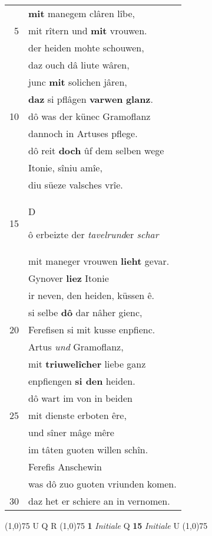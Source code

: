 \documentclass[8pt,a4paper,notitlepage]{article}
\begin{document}
\begin{table}[ht]
\begin{minipage}[t]{0.5\linewidth}
\begin{tabular}{rl}
 & \textbf{mit} manegem clâren lîbe,\\ 
5 & mit rîtern und \textbf{mit} vrouwen.\\ 
 & der heiden mohte schouwen,\\ 
 & daz ouch dâ liute wâren,\\ 
 & junc \textbf{mit} solichen jâren,\\ 
 & \textbf{daz} si pflâgen \textbf{varwen} \textbf{glanz}.\\ 
10 & dô was der künec Gramoflanz\\ 
 & dannoch in Artuses pflege.\\ 
 & dô reit \textbf{doch} ûf dem selben wege\\ 
 & Itonie, sîniu amîe,\\ 
 & diu süeze valsches vrîe.\\ 
15 & \begin{large}D\end{large}ô erbeizte der \textit{tavelrund}er \textit{schar}\\ 
 & mit maneger vrouwen \textbf{lieht} gevar.\\ 
 & Gynover \textbf{liez} Itonie\\ 
 & ir neven, den heiden, küssen ê.\\ 
 & si selbe \textbf{dô} dar nâher gienc,\\ 
20 & Ferefisen si mit kusse enpfienc.\\ 
 & Artus \textit{und} Gramoflanz,\\ 
 & mit \textbf{triuwelîcher} liebe ganz\\ 
 & enpfiengen \textbf{si den} heiden.\\ 
 & dô wart im von in beiden\\ 
25 & mit dienste erboten êre,\\ 
 & und sîner mâge mêre\\ 
 & im tâten guoten willen schîn.\\ 
 & Ferefis Anschewin\\ 
 & was dô zuo guoten vriunden komen.\\ 
30 & daz het er schiere an in vernomen.\\ 
\end{tabular}
\scriptsize
\line(1,0){75} \newline
U Q R \newline
\line(1,0){75} \newline
\textbf{1} \textit{Initiale} Q  \textbf{15} \textit{Initiale} U  \newline
\line(1,0){75} \newline

\end{minipage}
\end{table}
\end{document}
